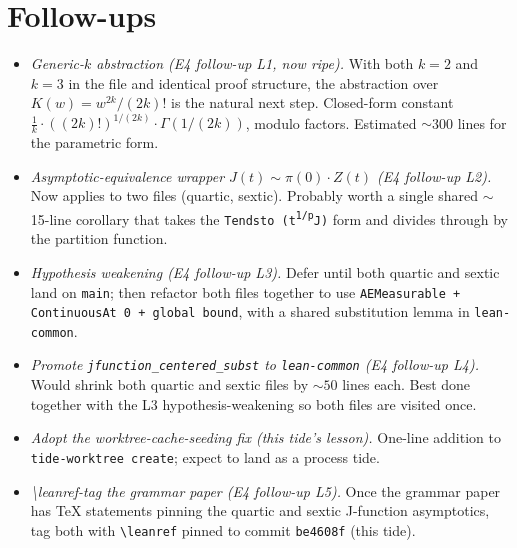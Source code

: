 \documentclass[11pt]{article}
\begin{document}
\section{Follow-ups}

\begin{itemize}[leftmargin=1em,itemsep=0.2em]
\item \emph{Generic-$k$ abstraction (E4 follow-up L1, now ripe).} With
both $k=2$ and $k=3$ in the file and identical proof structure,
the abstraction over $K(w) = w^{2k}/(2k)!$ is the natural next
step. Closed-form constant
$\tfrac{1}{k}\cdot ((2k)!)^{1/(2k)}\cdot \Gamma(1/(2k))$, modulo
factors. Estimated ${\sim}$300 lines for the parametric form.

\item \emph{Asymptotic-equivalence wrapper $J(t) \sim \pi(0)\cdot Z(t)$
(E4 follow-up L2).} Now applies to two files (quartic, sextic).
Probably worth a single shared $\sim$15-line corollary that takes
the \texttt{Tendsto (t\textsuperscript{1/p}\cdot J)} form and
divides through by the partition function.

\item \emph{Hypothesis weakening (E4 follow-up L3).} Defer until both
quartic and sextic land on \texttt{main}; then refactor both
files together to use \texttt{AEMeasurable + ContinuousAt 0 +
global bound}, with a shared substitution lemma in
\texttt{lean-common}.

\item \emph{Promote \texttt{jfunction\_centered\_subst} to
\texttt{lean-common} (E4 follow-up L4).} Would shrink both
quartic and sextic files by ${\sim}50$ lines each. Best done
together with the L3 hypothesis-weakening so both files are
visited once.

\item \emph{Adopt the worktree-cache-seeding fix (this tide's lesson).}
One-line addition to \texttt{tide-worktree create}; expect to
land as a process tide.

\item \emph{\textbackslash leanref-tag the grammar paper (E4 follow-up
L5).} Once the grammar paper has TeX statements pinning the
quartic and sextic J-function asymptotics, tag both with
\texttt{\textbackslash leanref} pinned to commit
\texttt{be4608f} (this tide).
\end{itemize}
\end{document}
